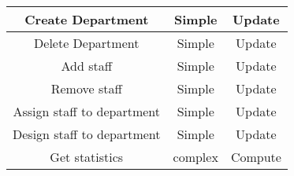 \begin{table}[htdp]
\begin{center}
\begin{tabular}{|c|c|c|}
Create Department & Simple & Update \\ \hline%
Delete Department & Simple & Update \\ \hline%
Add staff & Simple & Update \\ \hline%
Remove staff & Simple & Update \\ \hline%
Assign staff to department & Simple & Update \\ \hline%
Design staff to department & Simple & Update \\ \hline%
Get statistics & complex & Compute \\ \hline%

\end{tabular}
\end{center}
\label{default}
\end{table}%


